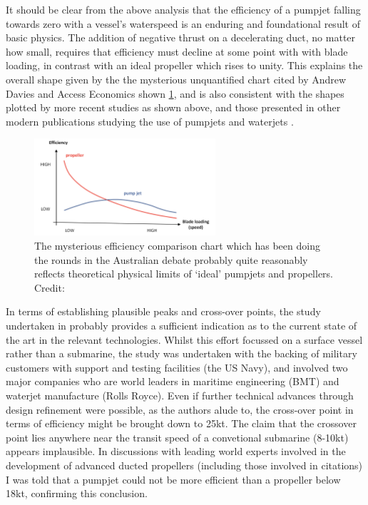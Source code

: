 \documentclass{article}\usepackage[]{graphicx}\usepackage[]{color}
\begin{document}
It should be clear from the above analysis that the efficiency of a pumpjet falling towards zero with a vessel's waterspeed is an enduring and foundational result of basic physics.  The addition of negative thrust on a decelerating duct, no matter how small, requires that efficiency must decline at some point with with blade loading, in contrast with an ideal propeller which rises to unity.  This explains the overall shape given by the the mysterious unquantified chart cited by Andrew Davies \parencite{davies2017} and Access Economics \parencite{stanford2017} shown \ref{fig:PumpUp.png}, and is also consistent with the shapes plotted by more recent studies as shown above, and those presented in other modern publications studying the use of pumpjets \parencite{giles2010} and waterjets \parencite{fujisawa1995}.

\begin{figure}[h]
\captionsetup{width=0.5\textwidth}
\includegraphics[width=0.6\textwidth, center]{PumpUp.png}
\caption{The mysterious efficiency comparison chart which has been doing the rounds in the Australian debate probably quite reasonably reflects theoretical physical limits of `ideal' pumpjets and propellers. Credit: \cite{stanford2017}}
\label{fig:PumpUp.png}
\end{figure}

In terms of establishing plausible peaks and cross-over points, the study undertaken in \cite{giles2010} probably provides a sufficient indication as to the current state of the art in the relevant technologies.  Whilst this effort focussed on a surface vessel rather than a submarine, the study was undertaken with the backing of military customers with support and testing facilities (the US Navy), and involved two major companies who are world leaders in maritime engineering (BMT) and waterjet manufacture (Rolls Royce). Even if further technical advances through design refinement were possible, as the authors alude to, the cross-over point in terms of efficiency might be brought down to 25kt.  The claim that the crossover point lies anywhere near the transit speed of a convetional submarine (8-10kt) appears implausible. In discussions with leading world experts involved in the development of advanced ducted propellers (including those involved in citations) I was told that a pumpjet could not be more efficient than a propeller below 18kt, confirming this conclusion.
\end{document}
